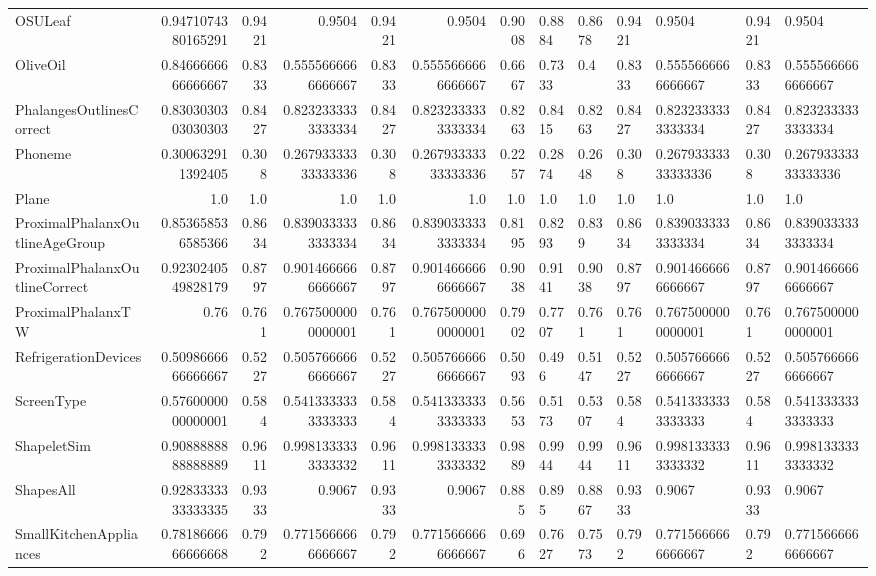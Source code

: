 \begin{table}[t]
\begin{tabular}{lrrrrrr}
OSULeaf & 0.9471074380165291 & 0.9421 & 0.9504 & 0.9421 & 0.9504 & 0.9008 & 0.8884 & 0.8678 & 0.9421 & 0.9504 & 0.9421 & 0.9504 \\
OliveOil & 0.8466666666666667 & 0.8333 & 0.5555666666666667 & 0.8333 & 0.5555666666666667 & 0.6667 & 0.7333 & 0.4 & 0.8333 & 0.5555666666666667 & 0.8333 & 0.5555666666666667 \\
PhalangesOutlinesCorrect & 0.8303030303030303 & 0.8427 & 0.8232333333333334 & 0.8427 & 0.8232333333333334 & 0.8263 & 0.8415 & 0.8263 & 0.8427 & 0.8232333333333334 & 0.8427 & 0.8232333333333334 \\
Phoneme & 0.300632911392405 & 0.308 & 0.26793333333333336 & 0.308 & 0.26793333333333336 & 0.2257 & 0.2874 & 0.2648 & 0.308 & 0.26793333333333336 & 0.308 & 0.26793333333333336 \\
Plane & 1.0 & 1.0 & 1.0 & 1.0 & 1.0 & 1.0 & 1.0 & 1.0 & 1.0 & 1.0 & 1.0 & 1.0 \\
ProximalPhalanxOutlineAgeGroup & 0.853658536585366 & 0.8634 & 0.8390333333333334 & 0.8634 & 0.8390333333333334 & 0.8195 & 0.8293 & 0.839 & 0.8634 & 0.8390333333333334 & 0.8634 & 0.8390333333333334 \\
ProximalPhalanxOutlineCorrect & 0.9230240549828179 & 0.8797 & 0.9014666666666667 & 0.8797 & 0.9014666666666667 & 0.9038 & 0.9141 & 0.9038 & 0.8797 & 0.9014666666666667 & 0.8797 & 0.9014666666666667 \\
ProximalPhalanxTW & 0.76 & 0.761 & 0.7675000000000001 & 0.761 & 0.7675000000000001 & 0.7902 & 0.7707 & 0.761 & 0.761 & 0.7675000000000001 & 0.761 & 0.7675000000000001 \\
RefrigerationDevices & 0.5098666666666667 & 0.5227 & 0.5057666666666667 & 0.5227 & 0.5057666666666667 & 0.5093 & 0.496 & 0.5147 & 0.5227 & 0.5057666666666667 & 0.5227 & 0.5057666666666667 \\
ScreenType & 0.5760000000000001 & 0.584 & 0.5413333333333333 & 0.584 & 0.5413333333333333 & 0.5653 & 0.5173 & 0.5307 & 0.584 & 0.5413333333333333 & 0.584 & 0.5413333333333333 \\
ShapeletSim & 0.9088888888888889 & 0.9611 & 0.9981333333333332 & 0.9611 & 0.9981333333333332 & 0.9889 & 0.9944 & 0.9944 & 0.9611 & 0.9981333333333332 & 0.9611 & 0.9981333333333332 \\
ShapesAll & 0.9283333333333335 & 0.9333 & 0.9067 & 0.9333 & 0.9067 & 0.885 & 0.895 & 0.8867 & 0.9333 & 0.9067 & 0.9333 & 0.9067 \\
SmallKitchenAppliances & 0.7818666666666668 & 0.792 & 0.7715666666666667 & 0.792 & 0.7715666666666667 & 0.696 & 0.7627 & 0.7573 & 0.792 & 0.7715666666666667 & 0.792 & 0.7715666666666667 \\

\end{tabular}
\end{table}
